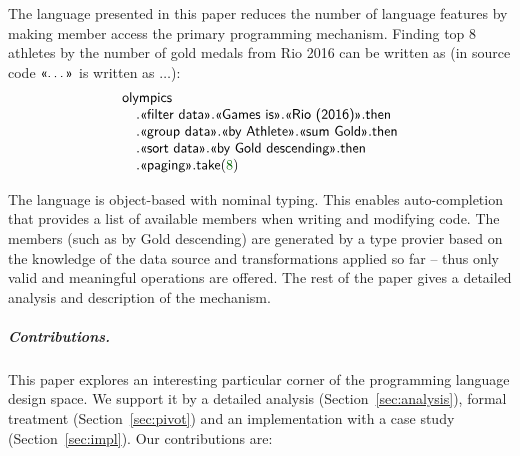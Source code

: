 \documentclass[a4paper,UKenglish]{lipics-v2016}
\theoremstyle{plain}
\theoremstyle{definition}
\newcommand{\num}[1]{\textcolor{numclr}{#1}}
\newcommand{\ident}[1]{\textnormal{\sffamily #1}}
\newcommand{\qident}[1]{\textnormal{\sffamily \guillemotleft #1\guillemotright}}
\begin{document}
The language presented in this paper reduces the number of language features by making member access
the primary programming mechanism. Finding top 8 athletes by the number of gold medals from Rio 2016 
can be written as (in source code $\qident{\ldots}$ is written as \textquotesingle$\ldots$\textquotesingle):
%
\begin{equation*}
\begin{array}{l}
\ident{olympics}\\
\quad.\qident{filter data}.\qident{Games is}.\qident{Rio (2016)}.\ident{then}\\
\quad.\qident{group data}.\qident{by Athlete}.\qident{sum Gold}.\ident{then}\\
\quad.\qident{sort data}.\qident{by Gold descending}.\ident{then}\\
\quad.\qident{paging}.\ident{take}(\num{8})\\
\end{array}
\end{equation*}

\noindent
The language is object-based with nominal typing. This enables auto-completion that  
provides a list of available members when writing and modifying code. The members (such as 
\qident{by Gold descending}) are generated by a type provier based on the knowledge of
the data source and transformations applied so far -- thus only valid and meaningful 
operations are offered. The rest of the paper gives a detailed analysis and description of the mechanism.

\subparagraph{Contributions.} This paper explores an interesting particular corner of the 
programming language design space. We support it by a detailed analysis (Section~\ref{sec:analysis}), 
formal treatment (Section~\ref{sec:pivot}) and an implementation with 
a case study (Section~\ref{sec:impl}). Our contributions are:
\end{document}
